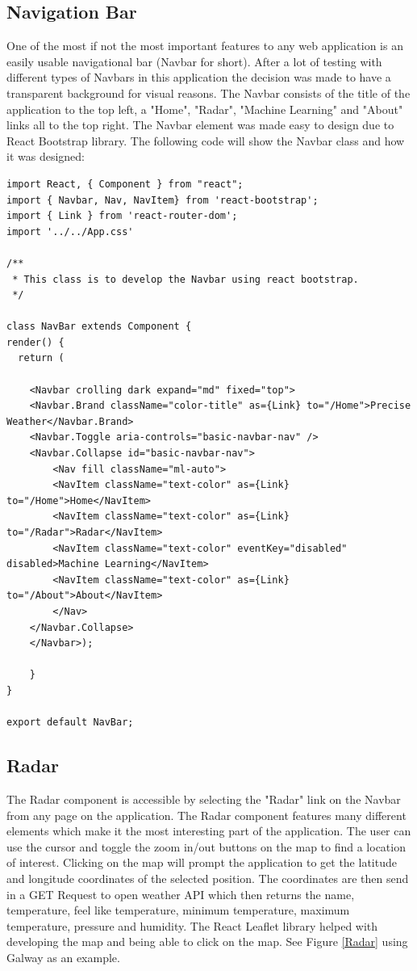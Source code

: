 \subsection{Navigation Bar}
One of the most if not the most important features to any web application is an easily usable navigational bar (Navbar for short). After a lot of testing with different types of Navbars in this application the decision was made to have a transparent background for visual reasons. The Navbar consists of the title of the application to the top left, a "Home", "Radar", "Machine Learning" and "About" links all to the top right. The Navbar element was made easy to design due to React Bootstrap library. The following code will show the Navbar class and how it was designed:

\begin{verbatim}
import React, { Component } from "react";
import { Navbar, Nav, NavItem} from 'react-bootstrap';
import { Link } from 'react-router-dom';
import '../../App.css'

/**
 * This class is to develop the Navbar using react bootstrap.
 */

class NavBar extends Component {
render() {
  return (

    <Navbar crolling dark expand="md" fixed="top">
    <Navbar.Brand className="color-title" as={Link} to="/Home">Precise Weather</Navbar.Brand>
    <Navbar.Toggle aria-controls="basic-navbar-nav" />
    <Navbar.Collapse id="basic-navbar-nav">
        <Nav fill className="ml-auto">
        <NavItem className="text-color" as={Link} to="/Home">Home</NavItem>
        <NavItem className="text-color" as={Link} to="/Radar">Radar</NavItem>
        <NavItem className="text-color" eventKey="disabled" disabled>Machine Learning</NavItem>
        <NavItem className="text-color" as={Link} to="/About">About</NavItem>
        </Nav>
    </Navbar.Collapse>
    </Navbar>);
        
    }
}

export default NavBar;
\end{verbatim}

\subsection{Radar}

The Radar component is accessible by selecting the "Radar" link on the Navbar from any page on the application. The Radar component features many different elements which make it the most interesting part of the application. The user can use the cursor and toggle the zoom in/out buttons on the map to find a location of interest. Clicking on the map will prompt the application to get the latitude and longitude coordinates of the selected position. The coordinates are then send in a GET Request to open weather API which then returns the name, temperature, feel like temperature, minimum temperature, maximum temperature, pressure and humidity. The React Leaflet library helped with developing the map and being able to click on the map. See Figure \ref{Radar} using Galway as an example.

